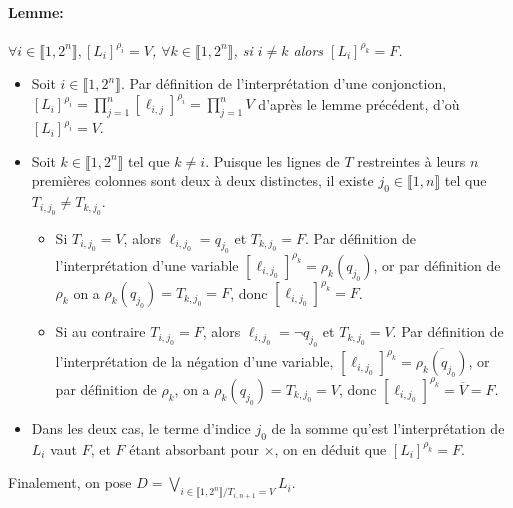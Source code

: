 \documentclass{scrartcl}
\newenvironment{demo}{\begin{itemize}[label=$\triangleright$]\item }{\end{itemize}}
\newcommand{\intset}[1]{\llbracket #1 \rrbracket}
\newcommand{\definition}[1]{{\parindent0pt #1}}
\begin{document}
				\paragraph{Lemme:} \textsl{$\forall i \in \intset{1,2^n}, [L_i]^{\rho_i} = V$, $\forall k \in \intset{1,2^n}$, si $i\neq k$ alors $[L_i]^{\rho_k} = F$.}
				\begin{demo}
					Soit $i \in \intset{1,2^n}.$ Par définition de l'interprétation d'une conjonction, 
					$[L_i]^{\rho_i} = \prod\limits_{j=1}^n [\ell_{i,j}]^{\rho_i} = \prod\limits_{j=1}^n V$ d'après le lemme précédent, d'où $[L_i]^{\rho_i} = V$.
					\item Soit $k \in \intset{1,2^n}$ tel que $k \neq i$. 
					Puisque les lignes de $T$ restreintes à leurs $n$ premières colonnes sont deux à deux distinctes, il existe $j_0 \in \intset{1,n}$ tel que $T_{i,j_0} \neq T_{k,j_0}$.
					\begin{itemize}
						\item Si $T_{i,j_0} = V$, alors $\ell_{i,j_0} = q_{j_0}$ et $T_{k,j_0} = F$. 
						Par définition de l'interprétation d'une variable $[\ell_{i,j_0}]^{\rho_k} = \rho_k(q_{j_0})$,
						or par définition de $\rho_k$ on a $\rho_k(q_{j_0}) = T_{k,j_0} = F$, donc $[\ell_{i,j_0}]^{\rho_k} = F$.
						\item Si au contraire $T_{i,j_0} = F$, alors $\ell_{i,j_0} = \neg q_{j_0}$ et $T_{k,j_0} = V$.
						Par définition de l'interprétation de la négation d'une variable,
						$[\ell_{i,j_0}]^{\rho_k} = \overline{\rho_k(q_{j_0})}$, or par définition de $\rho_k$, on a $\rho_k(q_{j_0}) = T_{k,j_0} = V$, 
						donc $[\ell_{i,j_0}]^{\rho_k} = \overline{V} = F$.
					\end{itemize}
					\item Dans les deux cas, le terme d'indice $j_0$ de la somme qu'est l'interprétation de $L_i$ vaut $F$, et $F$ étant absorbant pour $\times$, on en déduit que
					$[L_i]^{\rho_k} = F$.
				\end{demo}
				\vspace{10pt}

				\definition{Finalement, on pose $D = \bigvee\limits_{i\in\intset{1,2^n} / T_{i,n+1} = V} L_i$.}
\end{document}
